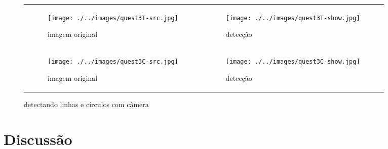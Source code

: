 \documentclass[journal]{IEEEtran}
\begin{document}
\FloatBarrier
\begin{figure}[!htp]
\begin{tabular}{ll}
	\begin{subfigure}[!htp]{0.2\textwidth}
		\centering
		\texttt{[image: ./../images/quest3T-src.jpg]}
		\caption{ imagem original}
		\label{fig:quest3-src-a}
	\end{subfigure}	
&
	\begin{subfigure}[!htp]{0.2\textwidth}
		\centering		
		\texttt{[image: ./../images/quest3T-show.jpg]}
		\caption{detecção}
		\label{fig:quest3-show-a}
	\end{subfigure}
\\
	\begin{subfigure}[!htp]{0.2\textwidth}
		\centering
		\texttt{[image: ./../images/quest3C-src.jpg]}
		\caption{imagem original}
		\label{fig:quest3-src-b}
	\end{subfigure}
&
	\begin{subfigure}[!htp]{0.2\textwidth}
		\centering		
		\texttt{[image: ./../images/quest3C-show.jpg]}
		\caption{detecção}
		\label{fig:quest3-show-b}
	\end{subfigure}

\end{tabular}
	\caption{detectando linhas e círculos com câmera}
	\label{fig:quest3}
\end{figure}
\FloatBarrier

\newpage
\section{Discussão}
\end{document}
